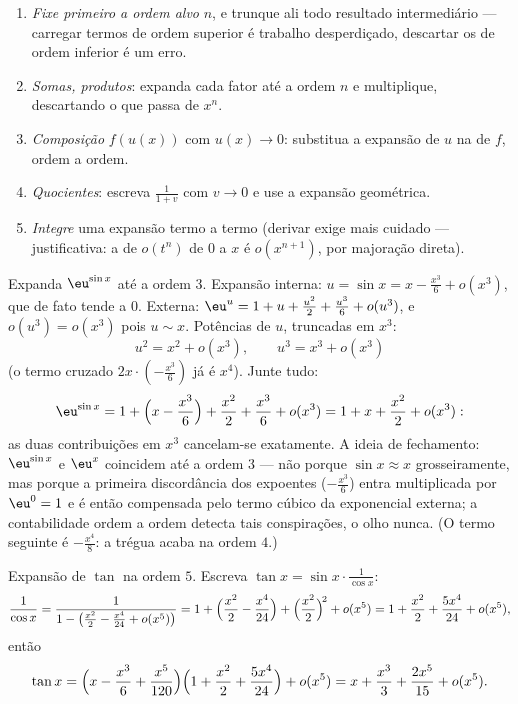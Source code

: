 \begin{method}\label{met:b1:taylor:compute}
\begin{enumerate}
  \item \emph{Fixe primeiro a ordem alvo} $n$, e trunque ali todo
        resultado intermediário --- carregar termos de ordem superior
        é trabalho desperdiçado, descartar os de ordem inferior é um
        erro.
  \item \emph{Somas, produtos}: expanda cada fator até a ordem $n$ e
        multiplique, descartando o que passa de $x^n$.
  \item \emph{Composição} $f(u(x))$ com $u(x) \to 0$: substitua
        a expansão de $u$ na de $f$, ordem a ordem.
  \item \emph{Quocientes}: escreva $\frac{1}{1 + v}$ com $v \to 0$ e
        use a expansão geométrica.
  \item \emph{Integre} uma expansão termo a termo (derivar exige mais
        cuidado --- justificativa: a  de $o(t^n)$ de $0$ a $x$
        é $o(x^{n+1})$, por majoração direta).
\end{enumerate}
\end{method}

\begin{example}\label{ex:b1:taylor:esin}
Expanda $\eu^{\sin x}$ até a ordem $3$. Expansão interna: $u = \sin x
= x - \frac{x^3}{6} + o(x^3)$, que de fato
tende a $0$. Externa: $\eu^u = 1 + u + \frac{u^2}{2} + \frac{u^3}{6} + o(u^3)$, e $o(u^3) = o(x^3)$ pois $u \sim x$. Potências de $u$,
truncadas em $x^3$:
\[
u^2 = x^2 + o(x^3), \qquad u^3 = x^3 + o(x^3)
\]
(o termo cruzado $2x\cdot(-\frac{x^3}{6})$ já é $x^4$).
Junte tudo:
\[
\eu^{\sin x} = 1 + \Bigl(x - \frac{x^3}{6}\Bigr) + \frac{x^2}{2}
+ \frac{x^3}{6} + o(x^3)
= 1 + x + \frac{x^2}{2} + o(x^3) :
\]
as duas contribuições em $x^3$ cancelam-se exatamente. A ideia de
fechamento: $\eu^{\sin x}$ e $\eu^x$ coincidem até a ordem $3$ --- não porque
$\sin x \approx x$ grosseiramente, mas porque a primeira discordância dos
expoentes ($-\frac{x^3}{6}$) entra multiplicada por $\eu^0 = 1$ e é então compensada
pelo termo cúbico da exponencial externa; a contabilidade ordem a
ordem detecta tais conspirações, o olho nunca. (O termo seguinte é
$-\frac{x^4}{8}$: a trégua acaba na ordem $4$.)
\end{example}

\begin{example}\label{ex:b1:taylor:tan}
Expansão de $\tan$ na ordem $5$. Escreva $\tan x =
\sin x \cdot \frac{1}{\cos x}$:
\[
\frac{1}{\cos x} = \frac{1}{1 - \bigl(\frac{x^2}{2} - \frac{x^4}{24}
+ o(x^5)\bigr)}
= 1 + \Bigl(\frac{x^2}{2} - \frac{x^4}{24}\Bigr)
+ \Bigl(\frac{x^2}{2}\Bigr)^{\!2} + o(x^5)
= 1 + \frac{x^2}{2} + \frac{5x^4}{24} + o(x^5),
\]
então
\[
\tan x = \Bigl(x - \frac{x^3}{6} + \frac{x^5}{120}\Bigr)
\Bigl(1 + \frac{x^2}{2} + \frac{5x^4}{24}\Bigr) + o(x^5)
= x + \frac{x^3}{3} + \frac{2x^5}{15} + o(x^5) .
\]
\end{example}

